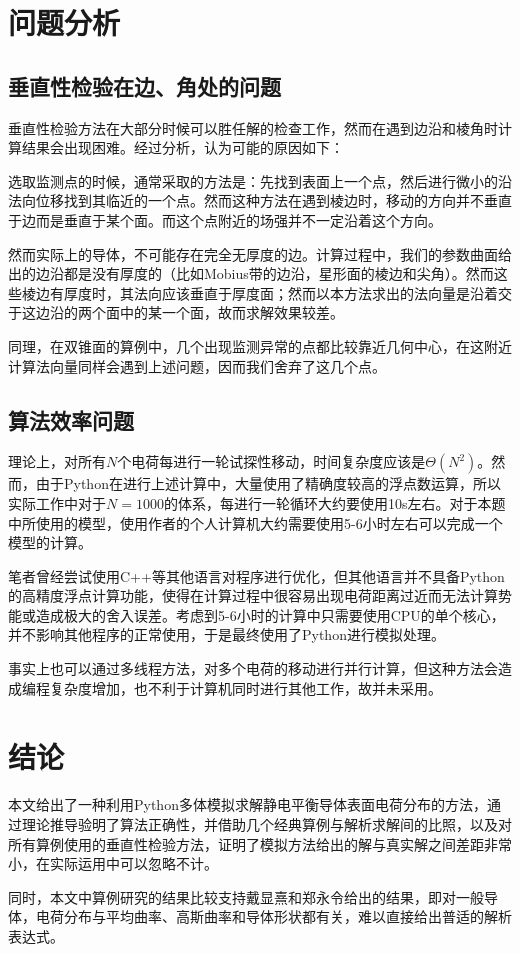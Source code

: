 \documentclass[UTF8]{article}
\numberwithin{figure}{subsection}
\numberwithin{table}{subsection}
\begin{document}
\begin{multicols}{2}
    \section{问题分析}
    \subsection{垂直性检验在边、角处的问题}
    \par 垂直性检验方法在大部分时候可以胜任解的检查工作，然而在遇到边沿和棱角时计算结果会出现困难。经过分析，认为可能的原因如下：
    \par 选取监测点的时候，通常采取的方法是：先找到表面上一个点，然后进行微小的沿法向位移找到其临近的一个点。然而这种方法在遇到棱边时，移动的方向并不垂直于边而是垂直于某个面。而这个点附近的场强并不一定沿着这个方向。
    \par 然而实际上的导体，不可能存在完全无厚度的边。计算过程中，我们的参数曲面给出的边沿都是没有厚度的（比如Mobius带的边沿，星形面的棱边和尖角）。然而这些棱边有厚度时，其法向应该垂直于厚度面；然而以本方法求出的法向量是沿着交于这边沿的两个面中的某一个面，故而求解效果较差。
    \par 同理，在双锥面的算例中，几个出现监测异常的点都比较靠近几何中心，在这附近计算法向量同样会遇到上述问题，因而我们舍弃了这几个点。
    \subsection{算法效率问题}
    \par 理论上，对所有$N$个电荷每进行一轮试探性移动，时间复杂度应该是$\Theta (N^2)$。然而，由于Python在进行上述计算中，大量使用了精确度较高的浮点数运算，所以实际工作中对于$N=1000$的体系，每进行一轮循环大约要使用10s左右。对于本题中所使用的模型，使用作者的个人计算机大约需要使用5-6小时左右可以完成一个模型的计算。
    \par 笔者曾经尝试使用C++等其他语言对程序进行优化，但其他语言并不具备Python的高精度浮点计算功能，使得在计算过程中很容易出现电荷距离过近而无法计算势能或造成极大的舍入误差。考虑到5-6小时的计算中只需要使用CPU的单个核心，并不影响其他程序的正常使用，于是最终使用了Python进行模拟处理。
    \par 事实上也可以通过多线程方法，对多个电荷的移动进行并行计算，但这种方法会造成编程复杂度增加，也不利于计算机同时进行其他工作，故并未采用。
    \section{结论}
    \par 本文给出了一种利用Python多体模拟求解静电平衡导体表面电荷分布的方法，通过理论推导验明了算法正确性，并借助几个经典算例与解析求解间的比照，以及对所有算例使用的垂直性检验方法，证明了模拟方法给出的解与真实解之间差距非常小，在实际运用中可以忽略不计。
    \par 同时，本文中算例研究的结果比较支持戴显熹和郑永令给出的结果，即对一般导体，电荷分布与平均曲率、高斯曲率和导体形状都有关，难以直接给出普适的解析表达式。

\end{multicols}
\end{document}
